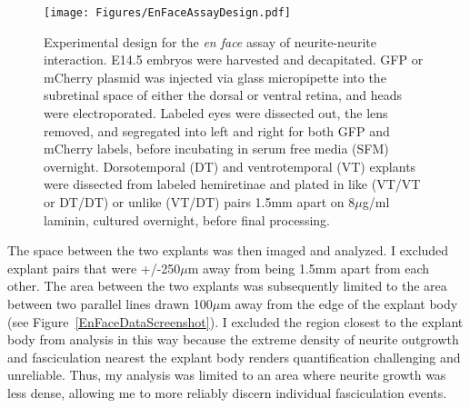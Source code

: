 \begin{figure}[hbtp]
    \begin{center}
        \texttt{[image: Figures/EnFaceAssayDesign.pdf]}
        \caption[Experimental design for the \emph{en face} assay of neurite-neurite interaction.]
        {Experimental design for the \emph{en face} assay of neurite-neurite interaction.
        E14.5 embryos were harvested and decapitated.
        GFP or mCherry plasmid was injected via glass micropipette into the subretinal space of either the dorsal or ventral retina, and heads were electroporated.
        Labeled eyes were dissected out, the lens removed, and segregated into left and right for both GFP and mCherry labels, before incubating in serum free media (SFM) overnight.
        Dorsotemporal (DT) and ventrotemporal (VT) explants were dissected from labeled hemiretinae and plated in like (VT/VT or DT/DT) or unlike (VT/DT) pairs 1.5mm apart on 8$\mu$g/ml laminin, cultured overnight, before final processing.
        }
        \label{Figures/EnFaceAssayDesign}
    \end{center}
\end{figure}
The space between the two explants was then imaged and analyzed.
I excluded explant pairs that were +/-250$\mu$m away from being 1.5mm apart from each other.
The area between the two explants was subsequently limited to the area between two parallel lines drawn 100$\mu$m away from the edge of the explant body (see Figure~\ref{EnFaceDataScreenshot}).
I excluded the region closest to the explant body from analysis in this way because the extreme density of neurite outgrowth and fasciculation nearest the explant body renders quantification challenging and unreliable.
Thus, my analysis was limited to an area where neurite growth was less dense, allowing me to more reliably discern individual fasciculation events.
